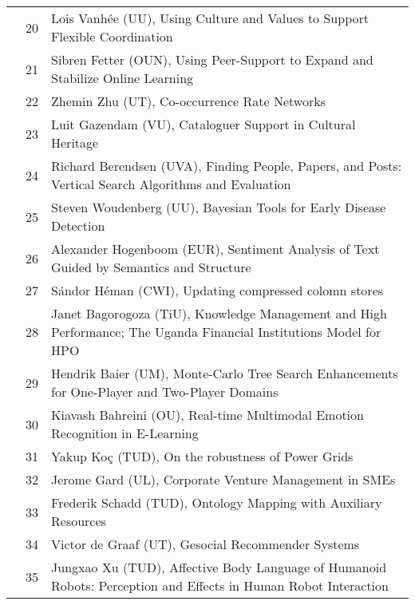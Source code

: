 \begin{longtabu}{@{}l@{ }l@{\hspace{1em}}X}
	&	 20	&	 Lois Vanh\'{e}e (UU), 	Using Culture and Values to Support Flexible Coordination\\
	&	 21	&	 Sibren Fetter (OUN), Using Peer-Support to Expand and Stabilize Online Learning\\
	&	 22	&	 Zhemin Zhu (UT), 	Co-occurrence Rate Networks\\
	&	 23	&	 Luit Gazendam (VU), Cataloguer Support in Cultural Heritage\\
	&	 24	&	 Richard Berendsen (UVA), 	Finding People, Papers, and Posts: Vertical Search Algorithms and Evaluation\\
	&	 25	&	 Steven Woudenberg (UU), Bayesian Tools for Early Disease Detection\\
	&	 26	&	 Alexander Hogenboom (EUR), Sentiment Analysis of Text Guided by Semantics and Structure\\
	&	 27	&	 S\'{a}ndor H\'{e}man (CWI), Updating compressed colomn stores\\
	&	 28	&	 Janet Bagorogoza (TiU), Knowledge Management and High Performance; The Uganda Financial Institutions Model for HPO\\
	&	 29	&	 Hendrik Baier (UM), Monte-Carlo Tree Search Enhancements for One-Player and Two-Player Domains\\
	&	 30	&	 Kiavash Bahreini (OU), Real-time Multimodal Emotion Recognition in E-Learning\\
	&	 31	&	 Yakup Ko\c{c} (TUD), On the robustness of Power Grids\\
	&	 32	&	 Jerome Gard (UL), Corporate Venture Management in SMEs\\
	&	 33	&	 Frederik Schadd (TUD), Ontology Mapping with Auxiliary Resources\\
	&	 34	&	 Victor de Graaf (UT), Gesocial Recommender Systems\\
	&	 35	&	 Jungxao Xu (TUD), Affective Body Language of Humanoid Robots: Perception and Effects in Human Robot Interaction\\


\end{longtabu}
